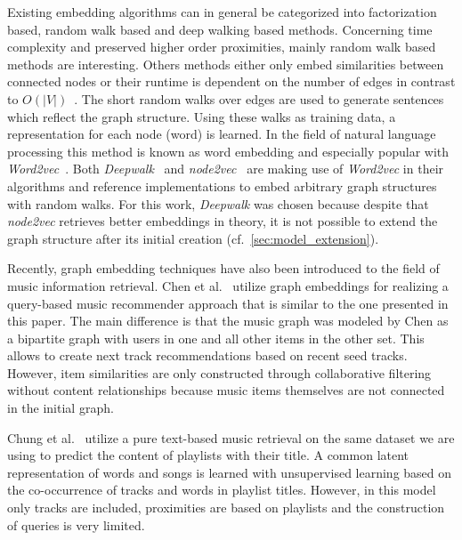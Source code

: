 \documentclass[sigconf]{acmart}
\begin{document}
Existing embedding algorithms can in general be categorized into factorization based, random walk based and deep walking based methods. Concerning time complexity and preserved higher order proximities, mainly random walk based methods are interesting. Others methods either only embed similarities between connected nodes or their runtime is dependent on the number of edges in contrast to $ O(|V|) $~\cite{goyal2017graph}. The short random walks over edges are used to generate sentences which reflect the graph structure. Using these walks as training data, a representation for each node (word) is learned. In the field of natural language processing this method is known as word embedding and especially popular with \emph{Word2vec}~\cite{mikolov2013efficient}. Both \emph{Deepwalk}~\cite{perozzi2014deepwalk} and \emph{node2vec}~\cite{grover2016node2vec} are making use of \emph{Word2vec} in their algorithms and reference implementations to embed arbitrary graph structures with random walks. For this work, \emph{Deepwalk} was chosen because despite that \emph{node2vec} retrieves better embeddings in theory, it is not possible to extend the graph structure after its initial creation (cf.~\ref{sec:model_extension}).

Recently, graph embedding techniques have also been introduced to the field of music information retrieval. Chen et al.~\cite{Chen:2016:QMR:2959100.2959169} utilize graph embeddings for realizing a query-based music recommender approach that is similar to the one presented in this paper. The main difference is that the music graph was modeled by Chen as a bipartite graph with users in one and all other items in the other set. This allows to create next track recommendations based on recent seed tracks. However, item similarities are only constructed through collaborative filtering without content relationships because music items themselves are not connected in the initial graph. 

Chung et al.~\cite{chungexploiting} utilize a pure text-based music retrieval on the same dataset we are using to predict the content of playlists with their title. A common latent representation of words and songs is learned with unsupervised learning based on the co-occurrence of tracks and words in playlist titles. However, in this model only tracks are included, proximities are based on playlists and the construction of queries is very limited. \\
\end{document}

